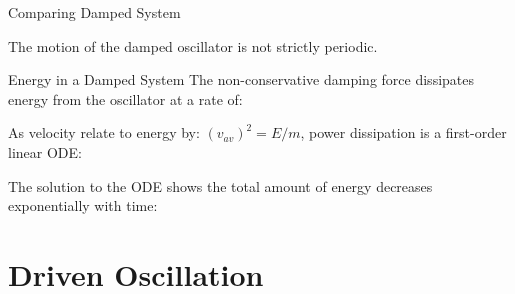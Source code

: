 \documentclass[12pt,compress,aspectratio=169]{beamer}
\begin{document}
\begin{frame}{Comparing Damped System}
  \centering
  
  The motion of the damped oscillator is not strictly periodic.
\end{frame}



\begin{frame}{Energy in a Damped System}
  The non-conservative damping force dissipates energy from the oscillator at
  a rate of:


  As velocity relate to energy by: $(v_{av})^2=E/m$, power
  dissipation is a first-order linear ODE:


  The solution to the ODE shows the total amount of energy decreases
  exponentially with time:

\end{frame}



\section{Driven Oscillation}
\end{document}
